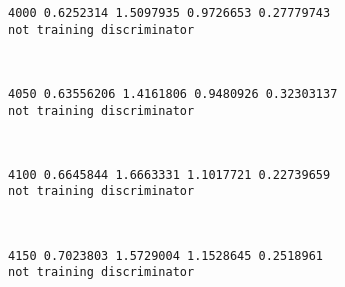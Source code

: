 \documentclass[11pt]{article}
\begin{document}
    \begin{Verbatim}[commandchars=\\\{\}]
4000 0.6252314 1.5097935 0.9726653 0.27779743
not training discriminator

    \end{Verbatim}

    \begin{center}
    \end{center}
    { \hspace*{\fill} \\}
    
    \begin{Verbatim}[commandchars=\\\{\}]
4050 0.63556206 1.4161806 0.9480926 0.32303137
not training discriminator

    \end{Verbatim}

    \begin{center}
    \end{center}
    { \hspace*{\fill} \\}
    
    \begin{Verbatim}[commandchars=\\\{\}]
4100 0.6645844 1.6663331 1.1017721 0.22739659
not training discriminator

    \end{Verbatim}

    \begin{center}
    \end{center}
    { \hspace*{\fill} \\}
    
    \begin{Verbatim}[commandchars=\\\{\}]
4150 0.7023803 1.5729004 1.1528645 0.2518961
not training discriminator

    \end{Verbatim}

    \begin{center}
    \end{center}
    { \hspace*{\fill} \\}
    
\end{document}
